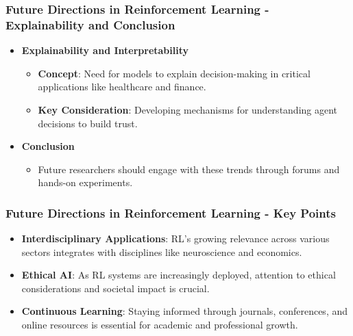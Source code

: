 \documentclass[aspectratio=169]{beamer}
\begin{document}
\begin{frame}[fragile]
    \frametitle{Future Directions in Reinforcement Learning - Explainability and Conclusion}
    \begin{itemize}
        \item \textbf{Explainability and Interpretability}
        \begin{itemize}
            \item \textbf{Concept}: Need for models to explain decision-making in critical applications like healthcare and finance.
            \item \textbf{Key Consideration}: Developing mechanisms for understanding agent decisions to build trust.
        \end{itemize}

        \item \textbf{Conclusion}
        \begin{itemize}
            \item Future researchers should engage with these trends through forums and hands-on experiments.
        \end{itemize}
    \end{itemize}
\end{frame}

\begin{frame}[fragile]
    \frametitle{Future Directions in Reinforcement Learning - Key Points}
    \begin{itemize}
        \item \textbf{Interdisciplinary Applications}: RL's growing relevance across various sectors integrates with disciplines like neuroscience and economics.
        \item \textbf{Ethical AI}: As RL systems are increasingly deployed, attention to ethical considerations and societal impact is crucial.
        \item \textbf{Continuous Learning}: Staying informed through journals, conferences, and online resources is essential for academic and professional growth.
    \end{itemize}
\end{frame}
\end{document}

